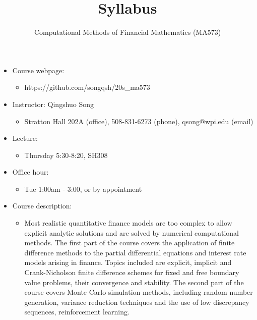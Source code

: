 \documentclass[11pt]{amsart}
\title{Syllabus}
\author{Computational Methods of Financial Mathematics (MA573)}
\begin{document}
\maketitle

\begin{itemize}
 
 \item Course webpage: 
\begin{itemize}
 \item  https://github.com/songqsh/20s\_ma573
\end{itemize}

 \item Instructor: Qingshuo Song 
\begin{itemize}
 \item  Stratton Hall 202A (office),  508-831-6273 (phone), qsong@wpi.edu (email)
\end{itemize}
\item Lecture:
\begin{itemize}
 \item Thursday 5:30-8:20,  SH308
\end{itemize}

 \item Office hour: 
\begin{itemize}
 \item Tue 1:00am - 3:00, or by appointment
\end{itemize}

\item Course description:
\begin{itemize}
 \item Most realistic quantitative finance models are too complex to allow explicit analytic solutions and are solved by numerical computational methods. The first part of the course covers the application of finite difference methods to the partial differential equations and interest rate models arising in finance. Topics included are explicit, implicit and Crank-Nicholson finite difference schemes for fixed and free boundary value problems, their convergence and stability. The second part of the course covers Monte Carlo simulation methods, including random number generation, variance reduction techniques and the use of low discrepancy sequences, reinforcement learning. 
\end{itemize}


\end{itemize}
\end{document}
